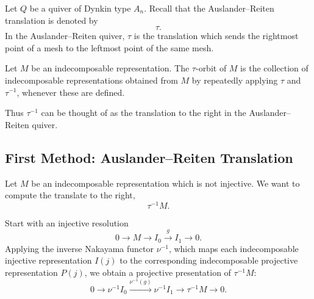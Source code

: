 \documentclass[11pt, a4paper]{report}
\begin{document}
Let \(Q\) be a quiver of Dynkin type \(A_n\). Recall that the Auslander--Reiten
translation is denoted by
\[
    \tau.
\]
In the Auslander--Reiten quiver, \(\tau\) is the translation which sends the
rightmost point of a mesh to the leftmost point of the same mesh.

\begin{definition}
    Let \(M\) be an indecomposable representation. The \(\tau\)-orbit of \(M\) is
    the collection of indecomposable representations obtained from \(M\) by
    repeatedly applying \(\tau\) and \(\tau^{-1}\), whenever these are defined.
\end{definition}

Thus \(\tau^{-1}\) can be thought of as the translation to the right in the
Auslander--Reiten quiver.

\subsection{First Method: Auslander--Reiten Translation}

Let \(M\) be an indecomposable representation which is not injective. We want to
compute the translate to the right,
\[
    \tau^{-1}M.
\]

Start with an injective resolution
\[
    0
    \longrightarrow
    M
    \longrightarrow
    I_0
    \xrightarrow{g}
    I_1
    \longrightarrow
    0.
\]
Applying the inverse Nakayama functor \(\nu^{-1}\), which maps each
indecomposable injective representation \(I(j)\) to the corresponding
indecomposable projective representation \(P(j)\), we obtain a projective
presentation of \(\tau^{-1}M\):
\[
    0
    \longrightarrow
    \nu^{-1}I_0
    \xrightarrow{\nu^{-1}(g)}
    \nu^{-1}I_1
    \longrightarrow
    \tau^{-1}M
    \longrightarrow
    0.
\]
\end{document}
